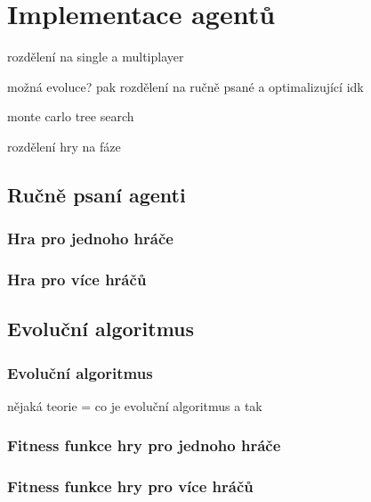 \chapter{Implementace agentů}

rozdělení na single a multiplayer

možná evoluce? pak rozdělení na ručně psané a optimalizující idk

monte carlo tree search

rozdělení hry na fáze

\section{Ručně psaní agenti}
\subsection{Hra pro jednoho hráče}
\subsection{Hra pro více hráčů}

\section{Evoluční algoritmus}
\subsection{Evoluční algoritmus}
nějaká teorie = co je evoluční algoritmus a tak
\subsection{Fitness funkce hry pro jednoho hráče}
\subsection{Fitness funkce hry pro více hráčů}

